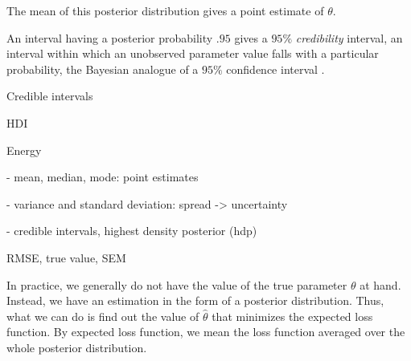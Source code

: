 The mean of this posterior distribution gives a point estimate of $\theta$. 

An interval having a posterior probability $.95$ gives a $95\%$ \textit{credibility} interval, an interval within which an unobserved parameter value falls with a particular probability, the Bayesian analogue of a $95\%$ confidence interval \cite[p. 777]{STK}.

Credible intervals 

HDI 

Energy

- mean, median, mode: point estimates

- variance and standard deviation: spread -> uncertainty 

- credible intervals, highest density posterior (hdp) 


RMSE, true value, SEM 

In practice, we generally do not have the value of the true parameter $\theta$ at hand. Instead, we have an estimation in the form of a posterior distribution. Thus, what we can do is find out the value of $\hat{\theta}$ that minimizes the expected loss function. By expected loss function, we mean the loss function averaged over the whole posterior distribution. 










